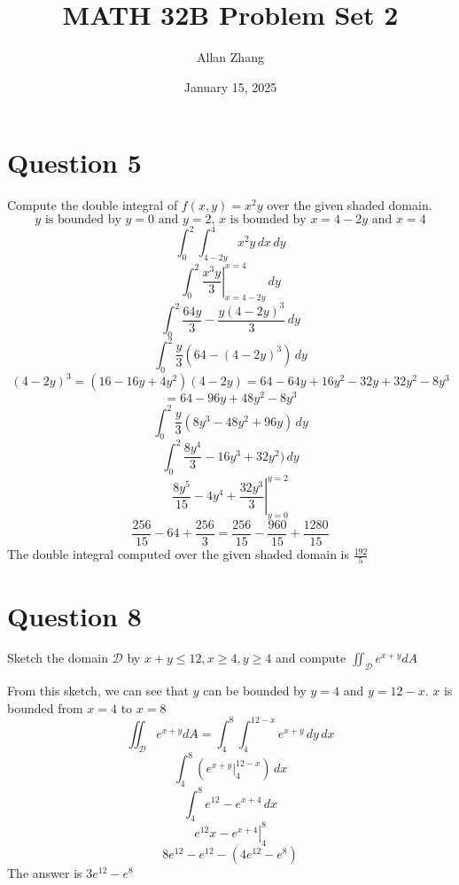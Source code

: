 \documentclass[hidelinks]{article}
\title{\textbf{MATH 32B Problem Set 2}}
\author{Allan Zhang}
\date{January 15, 2025}
\begin{document}
\hypersetup{bookmarksnumbered=true,}
\pagecolor{white}
\color{black}
\maketitle

\section{Question 5}
Compute the double integral of $f(x,y) = x^2y$ over the given shaded domain.
\[
    \text{$y$ is bounded by $y = 0$ and $y = 2$, $x$ is bounded by $x = 4-2y$ and $x = 4$}
\]
\[
    \int_{0}^2 \int_{4 -2y}^{4} x^2y \, dx \, dy
\]
\[
    \int_{0}^2 \left . \frac{x^3y}{3} \right |_{x = 4 -2y}^{x = 4}\, dy
\]
\[
    \int_{0}^2 \frac{64y}{3} - \frac{y(4-2y)^3}{3}\, dy
\]
\[
    \int_{0}^2 \frac{y}{3}(64 - (4-2y)^3) \, dy
\]
\[
    (4-2y)^3 = (16 - 16y + 4y^2)(4 - 2y) = 64 - 64y + 16y^2 - 32y + 32y^2 -8y^3 
\]
\[
    = 64 - 96y + 48y^2 - 8y^3   
\]
\[
    \int_{0}^2 \frac{y}{3}(8y^3 - 48y^2 + 96y) \, dy
\]
\[
    \int_{0}^2 \frac{8y^4}{3} - 16y^3 + 32y^2) \, dy
\]
\[
    \left. \frac{8y^5}{15} - 4y^4 + \frac{32y^3}{3} \right |_{y = 0}^{y = 2}
\]
\[
    \frac{256}{15} - 64 + \frac{256}{3} = \frac{256}{15} - \frac{960}{15} + \frac{1280}{15}
\]
The double integral computed over the given shaded domain is $\frac{192}{5}$


\newpage
\section{Question 8}
Sketch the domain $\mathcal{D}$ by $x+y \leq 12, x \geq 4, y \geq 4$ and compute $\iint_{\mathcal{D}}e^{x+y}dA$
\begin{center}
\end{center}
From this sketch, we can see that $y$ can be bounded by $y = 4$ and $y = 12 - x$. $x$ is bounded from $x = 4$ to $x = 8$
\[
    \iint_{\mathcal{D}}e^{x+y}dA = \int_{4}^8 \int_{4}^{12-x} e^{x+y} \, dy \,dx
\]
\[
    \int_{4}^8 \left ( e^{x+y} \Big|_{4}^{12-x}\right ) \,dx
\]
\[
    \int_{4}^8 e^{12} - e^{x+4} \,dx
\]
\[
    \left . e^{12}x - e^{x+4} \right |_{4}^8
\]
\[
    8e^12 - e^12 - (4e^12 -e^8) 
\]
The answer is $3e^{12} - e^8$
\end{document}
